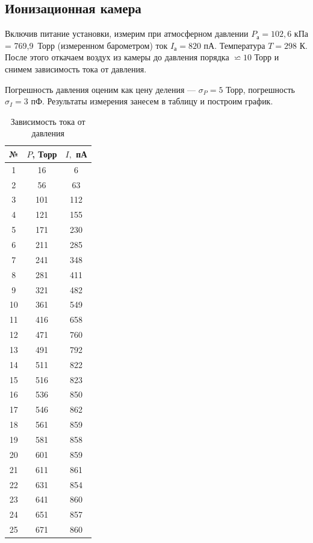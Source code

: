 \documentclass[12pt]{kiarticle} %
\begin{document}
		\subsection{Ионизационная камера}
		
		Включив питание установки, измерим при атмосферном давлении $ P_а = 102,6 $ кПа = 769,9~Торр (измеренном барометром) ток $ I_а = 820 $ пА. Температура $ T = 298 $ К. После этого откачаем воздух из камеры до давления порядка $ \backsimeq 10 $ Торр и снимем зависимость тока от давления.
		
		Погрешность давления оценим как цену деления --- $ \sigma_P = 5 $ Торр, погрешность $ \sigma_I = 3 $ пФ. Результаты измерения занесем в таблицу и построим график.
		
			\begin{table}[h!]
			\caption{Зависимость тока от давления}
			\begin{center}
				\begin{tabular}{|c|c|c|}
					\hline 
					№ & $ P $, Торр & $ I, $ пА  \\ 
					\hline 
				1 & 16 & 6 \\
				2 & 56 & 63 \\
				3 & 101 & 112 \\
				4 & 121 & 155 \\
				5 & 171 & 230 \\
				6 & 211 & 285 \\
				7 & 241 & 348 \\
				8 & 281 & 411 \\
				9 & 321 & 482 \\
				10 & 361 & 549 \\
				11 & 416 & 658 \\
				12 & 471 & 760 \\
				13 & 491 & 792 \\
				14 & 511 & 822 \\
				15 & 516 & 823 \\
				16 & 536 & 850 \\
				17 & 546 & 862 \\
				18 & 561 & 859 \\
				19 & 581 & 858 \\
				20 & 601 & 859 \\
				21 & 611 & 861 \\
				22 & 631 & 854 \\
				23 & 641 & 860 \\
				24 & 651 & 857 \\
				25 & 671 & 860 \\
					\hline 
				\end{tabular} 
			\end{center}
			\label{table ion}
		\end{table}
	
\end{document}
